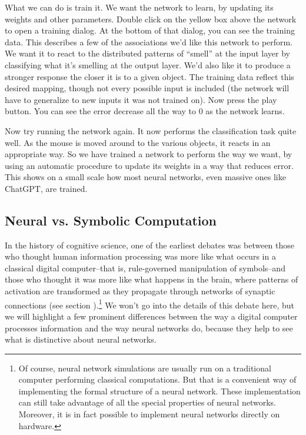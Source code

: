 What we can do is train it. We want the network to learn, by updating its weights and other parameters.  Double click on the yellow box above the network to open a training dialog. At the bottom of that dialog, you can see the training data. This describes a few of the associations we'd like this network to perform.  We want it to react to the distributed patterns of ``smell'' at the input layer by classifying what it's smelling at the output layer. We'd also like it to produce a stronger response the closer it is to a given object.  The training data reflect this desired mapping, though not every possible input is included (the network will have to generalize to new inputs it was not trained on). Now press the play button. You can see the error decrease all the way to 0 as the network learns.

Now try running the network again. It now performs the classification task quite well.  As the mouse is moved around to the various objects, it reacts in an appropriate way. So we have trained a network to perform the way we want, by using an automatic procedure to update its weights in a way that reduces error. This shows on a small scale how most neural networks, even massive ones like ChatGPT, are trained.

\subsection{Neural vs. Symbolic Computation}\label{classicalAIComparison}

In the history of cognitive science, one of the earliest debates was between those who thought human information processing was more like what occurs in a classical digital computer--that is, rule-governed manipulation of symbols--and those who thought it was more like what happens in the brain, where patterns of activation are transformed as they propagate through networks of synaptic connections (see section ).\footnote{Of course, neural network simulations are usually run on a traditional computer performing classical computations. But that is a convenient way of implementing the formal structure of a neural network. These implementation can still take advantage of all the special properties of neural networks. Moreover, it is in fact possible to implement neural networks directly on hardware.} We won't go into the details of this debate here, but we will highlight a few prominent differences between the way a digital computer processes information and the way neural networks do, because they help to see what is distinctive about neural networks.

